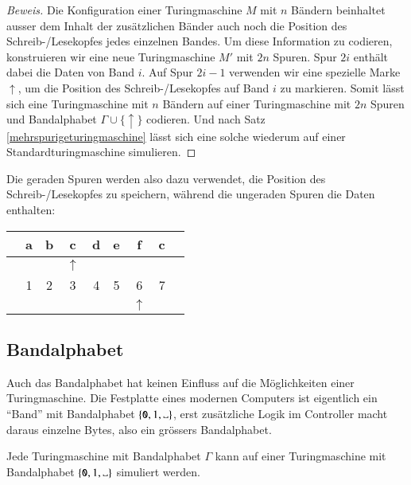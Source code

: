 \begin{proof}[Beweis]
Die Konfiguration einer Turingmaschine $M$ mit $n$ Bändern beinhaltet
ausser dem Inhalt der zusätzlichen Bänder auch noch die Position
des Schreib-/Lesekopfes jedes einzelnen Bandes. Um diese Information
zu codieren, konstruieren wir eine neue Turingmaschine $M'$ mit
$2n$ Spuren. Spur $2i$ enthält dabei die Daten von Band $i$.
Auf Spur $2i-1$ verwenden wir eine spezielle Marke $\uparrow$, um die Position
des Schreib-/Lesekopfes auf Band $i$ zu markieren. Somit lässt sich
eine Turingmaschine mit $n$ Bändern auf einer Turingmaschine mit
$2n$ Spuren und Bandalphabet $\Gamma\cup\{\uparrow\}$ codieren.
Und nach Satz \ref{mehrspurigeturingmaschine} lässt sich eine solche wiederum
auf einer Standardturingmaschine simulieren.
\end{proof}
Die geraden Spuren werden also dazu verwendet, die Position des
Schreib-/Lesekopfes zu speichern, während die ungeraden Spuren
die Daten enthalten:
\begin{center}
\begin{tabular}{c|c|c|c|c|c|c|c|c}
\hline
&a&b&c&d&e&f&c&\\
\hline
& & &$\uparrow$& & & & &\\
\hline
&1&2&3&4&5&6&7&\\
\hline
& & & & & &$\uparrow$& &\\
\hline
\end{tabular}
\end{center}

\subsection{Bandalphabet}
Auch das Bandalphabet hat keinen Einfluss auf die Möglichkeiten einer
Turingmaschine. Die Festplatte eines modernen Computers ist eigentlich
ein ``Band'' mit Bandalphabet $\{\texttt{0},1,\blank\}$, erst zusätzliche
Logik im Controller macht daraus einzelne Bytes, also ein grössers
Bandalphabet.

\begin{satz}
Jede Turingmaschine mit Bandalphabet $\Gamma$ kann auf einer Turingmaschine
mit Bandalphabet $\{\texttt{0},1,\blank\}$ simuliert werden.
\end{satz}

